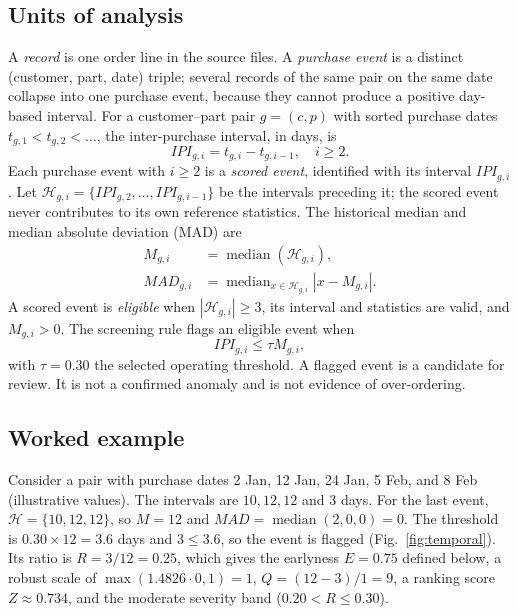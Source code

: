 \documentclass[conference]{IEEEtran}
\begin{document}
\subsection{Units of analysis}
A \emph{record} is one order line in the source files. A \emph{purchase event} is a distinct (customer, part, date) triple; several records of the same pair on the same date collapse into one purchase event, because they cannot produce a positive day-based interval. For a customer--part pair $g=(c,p)$ with sorted purchase dates $t_{g,1}<t_{g,2}<\dots$, the inter-purchase interval, in days, is
\begin{equation}
    IPI_{g,i}=t_{g,i}-t_{g,i-1},\quad i\geq 2.
    \label{eq:ipi}
\end{equation}
Each purchase event with $i\geq2$ is a \emph{scored event}, identified with its interval $IPI_{g,i}$. Let $\mathcal{H}_{g,i}=\{IPI_{g,2},\dots,IPI_{g,i-1}\}$ be the intervals preceding it; the scored event never contributes to its own reference statistics. The historical median and median absolute deviation (MAD) \cite{rousseeuw1993} are
\begin{align}
    M_{g,i} &= \operatorname{median}(\mathcal{H}_{g,i}), \label{eq:median}\\
    MAD_{g,i} &= \operatorname{median}_{x\in\mathcal{H}_{g,i}}|x-M_{g,i}|. \label{eq:mad}
\end{align}
A scored event is \emph{eligible} when $|\mathcal{H}_{g,i}|\geq3$, its interval and statistics are valid, and $M_{g,i}>0$. The screening rule flags an eligible event when
\begin{equation}
    IPI_{g,i} \leq \tau M_{g,i},
    \label{eq:threshold}
\end{equation}
with $\tau=0.30$ the selected operating threshold. A flagged event is a candidate for review. It is not a confirmed anomaly and is not evidence of over-ordering.

\subsection{Worked example}
Consider a pair with purchase dates 2 Jan, 12 Jan, 24 Jan, 5 Feb, and 8 Feb (illustrative values). The intervals are $10, 12, 12$ and $3$ days. For the last event, $\mathcal{H}=\{10,12,12\}$, so $M=12$ and $MAD=\operatorname{median}(2,0,0)=0$. The threshold is $0.30\times12=3.6$ days and $3\leq3.6$, so the event is flagged (Fig.~\ref{fig:temporal}). Its ratio is $R=3/12=0.25$, which gives the earlyness $E=0.75$ defined below, a robust scale of $\max(1.4826\cdot0,1)=1$, $Q=(12-3)/1=9$, a ranking score $Z\approx0.734$, and the moderate severity band ($0.20<R\leq0.30$).
\end{document}
